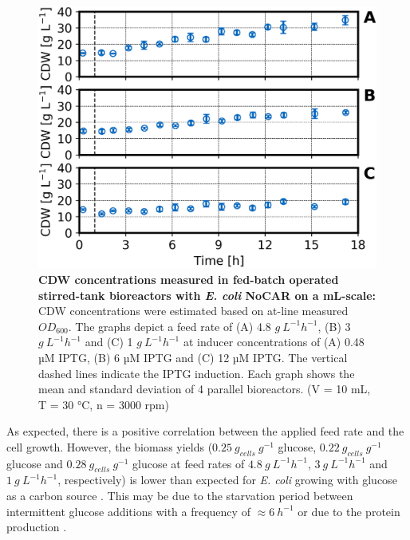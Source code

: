\documentclass[sn-standardnature]{sn-jnl}%
\theoremstyle{thmstyleone}%
\theoremstyle{thmstyletwo}%
\theoremstyle{thmstylethree}%
\begin{document}
\begin{figure}[H]
    \centering
    \includegraphics[width=1.0\textwidth]{figures/btm_overview.png}
    \caption{
        \textbf{CDW concentrations measured in fed-batch operated stirred-tank bioreactors with \textit{E. coli} NoCAR on a mL-scale:}
        CDW concentrations were estimated based on at-line measured $OD_{600}$.
        The graphs depict a feed rate of (A) 4.8 $ g\ L^{-1} h^{-1}$, (B) 3 $ g\ L^{-1} h^{-1}$ and (C) 1 $ g\ L^{-1} h^{-1}$ at inducer concentrations of (A) 0.48 µM IPTG, (B) 6 µM IPTG and (C) 12 µM IPTG.
        The vertical dashed lines indicate the IPTG induction.
        Each graph shows the mean and standard deviation of 4 parallel bioreactors.
        (V = 10 mL, T = 30 °C, n = 3000 rpm)
    }
    \label{fig_btmoverview}
\end{figure}

As expected, there is a positive correlation between the applied feed rate and the cell growth.
However, the biomass yields ($0.25\ g_{cells}\ g^{-1}$ glucose, $0.22\ g_{cells}\ g^{-1}$ glucose and $0.28\ g_{cells}\ g^{-1}$ glucose at feed rates of $4.8\ g\ L^{-1} h^{-1}$, $3\ g\ L^{-1} h^{-1}$ and $1\ g\ L^{-1} h^{-1}$, respectively) is lower than expected for \textit{E. coli} growing with glucose as a carbon source \cite{schmideder2015novel}.
This may be due to the starvation period between intermittent glucose additions with a frequency of $\approx 6\ h^{-1}$ or due to the protein production \cite{faust2014feeding}.
\end{document}
